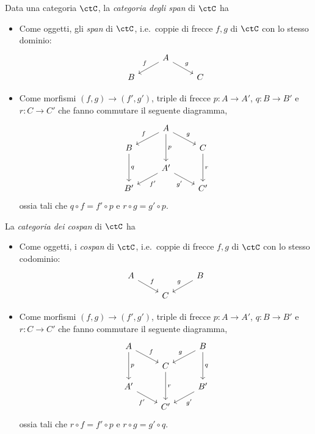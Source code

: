 \begin{definition}\label{def_span_e_cospan}
Data una categoria \(\ctC\), la \emph{categoria degli span} di \(\ctC\) ha 
\begin{itemize}
	\item Come oggetti, gli \emph{span} di \(\ctC\), i.e.\ coppie di frecce \(f,g\) di \(\ctC\) con lo stesso dominio: 
	\[
	\begin{tikzcd}[row sep=small]
		& A \ar{dl}[swap]{f} \ar{dr}{g} \\
		B && C
	\end{tikzcd}
	\]
	\item Come morfismi \((f,g)\to (f',g')\), triple di frecce \(p:A\to A'\), \(q:B\to B'\) e \(r:C\to C'\) che fanno commutare il seguente diagramma,
	\[
	\begin{tikzcd}[row sep=small]
		& A \ar{dd}{p} \ar{dl}[swap]{f} \ar{dr}{g} \\
		B \ar{dd}{q} && C \ar{dd}{r} \\
		& A' \ar{dl}{f'} \ar{dr}[swap]{g'} \\
		B' && C'
	\end{tikzcd}
	\]
	ossia tali che \(q\circ f=f'\circ p\) e \(r\circ g=g'\circ p\).
\end{itemize}

La \emph{categoria dei cospan} di \(\ctC\) ha 
\begin{itemize}
	\item Come oggetti, i \emph{cospan} di \(\ctC\), i.e.\ coppie di frecce \(f,g\) di \(\ctC\) con lo stesso codominio: 
	\[
	\begin{tikzcd}[row sep=small]
		A \ar{dr}{f} && B \ar{dl}[swap]{g} \\
		& C
	\end{tikzcd}
	\]
	\item Come morfismi \((f,g)\to (f',g')\), triple di frecce \(p:A\to A'\), \(q:B\to B'\) e \(r:C\to C'\) che fanno commutare il seguente diagramma,
	\[
	\begin{tikzcd}[row sep=small]
		A \ar{dd}{p} \ar{dr}{f} && B \ar{dd}{q} \ar{dl}[swap]{g} \\
		& C \ar{dd}{r} \\
		A' \ar{dr}[swap]{f'} && B' \ar{dl}{g'} \\
		& C'
	\end{tikzcd}
	\]
	ossia tali che \(r\circ f=f'\circ p\) e \(r\circ g=g'\circ q\).
\end{itemize}
\end{definition}


